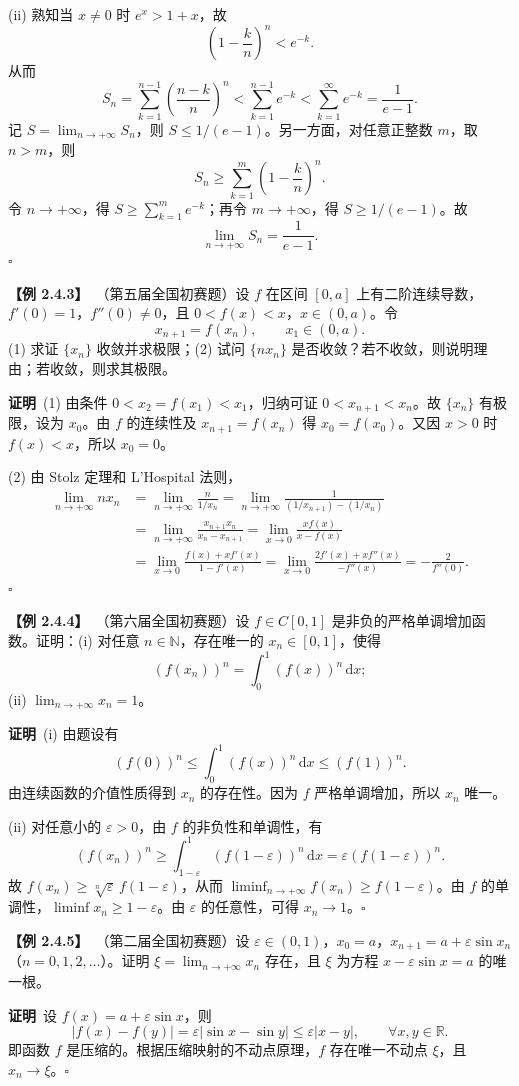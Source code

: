 \documentclass[UTF8,a4paper,11pt]{ctexart}
\newcommand{\ex}[1]{\par\medskip\noindent\textbf{【例 #1】}\ }
\newcommand{\pf}{\par\noindent\textbf{证明}\ }
\begin{document}
(ii) 熟知当 $x\ne0$ 时 $e^x>1+x$，故
\[
\left(1-\frac{k}{n}\right)^n<e^{-k}.
\]
从而
\[
S_n=\sum_{k=1}^{n-1}\left(\frac{n-k}{n}\right)^n
<\sum_{k=1}^{n-1}e^{-k}<\sum_{k=1}^{\infty}e^{-k}=\frac1{e-1}.
\]
记 $S=\lim_{n\to+\infty}S_n$，则 $S\le1/(e-1)$。另一方面，对任意正整数 $m$，取 $n>m$，则
\[
S_n\ge\sum_{k=1}^{m}\left(1-\frac{k}{n}\right)^n.
\]
令 $n\to+\infty$，得 $S\ge\sum_{k=1}^{m}e^{-k}$；再令 $m\to+\infty$，得 $S\ge1/(e-1)$。故
\[
\lim_{n\to+\infty}S_n=\frac1{e-1}.
\]\hfill$\square$

\ex{2.4.3}（第五届全国初赛题）设 $f$ 在区间 $[0,a]$ 上有二阶连续导数，$f'(0)=1$，$f''(0)\ne0$，且 $0<f(x)<x$，$x\in(0,a)$。令
\[
x_{n+1}=f(x_n),\qquad x_1\in(0,a).
\]
(1) 求证 $\{x_n\}$ 收敛并求极限；(2) 试问 $\{nx_n\}$ 是否收敛？若不收敛，则说明理由；若收敛，则求其极限。

\pf (1) 由条件 $0<x_2=f(x_1)<x_1$，归纳可证 $0<x_{n+1}<x_n$。故 $\{x_n\}$ 有极限，设为 $x_0$。由 $f$ 的连续性及 $x_{n+1}=f(x_n)$ 得 $x_0=f(x_0)$。又因 $x>0$ 时 $f(x)<x$，所以 $x_0=0$。

(2) 由 Stolz 定理和 L'Hospital 法则，
\begin{align*}
\lim_{n\to+\infty}nx_n
&=\lim_{n\to+\infty}\frac{n}{1/x_n}
=\lim_{n\to+\infty}\frac1{(1/x_{n+1})-(1/x_n)}\\
&=\lim_{n\to+\infty}\frac{x_{n+1}x_n}{x_n-x_{n+1}}
=\lim_{x\to0}\frac{x f(x)}{x-f(x)}\\
&=\lim_{x\to0}\frac{f(x)+xf'(x)}{1-f'(x)}
=\lim_{x\to0}\frac{2f'(x)+xf''(x)}{-f''(x)}
=-\frac2{f''(0)}.
\end{align*}
\hfill$\square$

\ex{2.4.4}（第六届全国初赛题）设 $f\in C[0,1]$ 是非负的严格单调增加函数。证明：(i) 对任意 $n\in\mathbb N$，存在唯一的 $x_n\in[0,1]$，使得
\[
(f(x_n))^n=\int_0^1(f(x))^n\,\mathrm dx;
\]
(ii) $\lim_{n\to+\infty}x_n=1$。

\pf (i) 由题设有
\[
(f(0))^n\le\int_0^1(f(x))^n\,\mathrm dx\le(f(1))^n.
\]
由连续函数的介值性质得到 $x_n$ 的存在性。因为 $f$ 严格单调增加，所以 $x_n$ 唯一。

(ii) 对任意小的 $\varepsilon>0$，由 $f$ 的非负性和单调性，有
\[
(f(x_n))^n\ge\int_{1-\varepsilon}^1(f(1-\varepsilon))^n\,\mathrm dx
=\varepsilon(f(1-\varepsilon))^n.
\]
故 $f(x_n)\ge\sqrt[n]{\varepsilon}\,f(1-\varepsilon)$，从而 $\liminf_{n\to+\infty}f(x_n)\ge f(1-\varepsilon)$。由 $f$ 的单调性，$\liminf x_n\ge1-\varepsilon$。由 $\varepsilon$ 的任意性，可得 $x_n\to1$。\hfill$\square$

\ex{2.4.5}（第二届全国初赛题）设 $\varepsilon\in(0,1)$，$x_0=a$，$x_{n+1}=a+\varepsilon\sin x_n$（$n=0,1,2,\ldots$）。证明 $\xi=\lim_{n\to+\infty}x_n$ 存在，且 $\xi$ 为方程 $x-\varepsilon\sin x=a$ 的唯一根。
\pf 设 $f(x)=a+\varepsilon\sin x$，则
\[
|f(x)-f(y)|=\varepsilon|\sin x-\sin y|\le\varepsilon|x-y|,\qquad \forall x,y\in\mathbb R.
\]
即函数 $f$ 是压缩的。根据压缩映射的不动点原理，$f$ 存在唯一不动点 $\xi$，且 $x_n\to\xi$。\hfill$\square$
\end{document}
